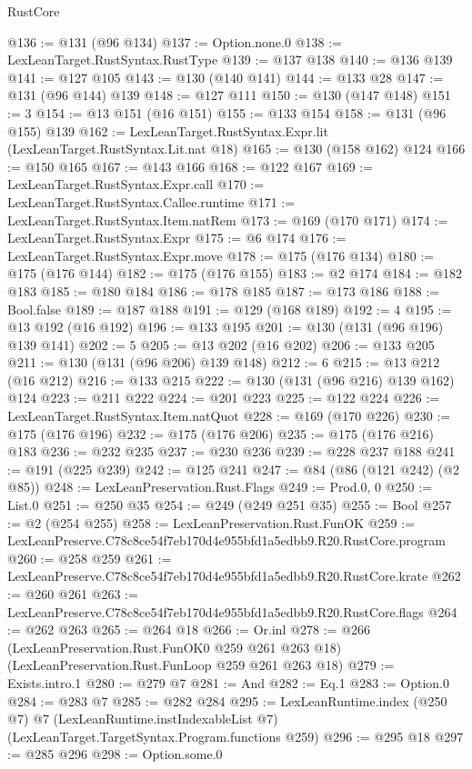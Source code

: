 \begin{lexlean}{RustCore}
\begin{coremodule}
@136 := @131 (@96 @134)
@137 := Option.none.{0}
@138 := LexLeanTarget.RustSyntax.RustType
@139 := @137 @138
@140 := @136 @139
@141 := @127 @105
@143 := @130 (@140 @141)
@144 := @133 @28
@147 := @131 (@96 @144) @139
@148 := @127 @111
@150 := @130 (@147 @148)
@151 := 3
@154 := @13 @151 (@16 @151)
@155 := @133 @154
@158 := @131 (@96 @155) @139
@162 := LexLeanTarget.RustSyntax.Expr.lit (LexLeanTarget.RustSyntax.Lit.nat @18)
@165 := @130 (@158 @162) @124
@166 := @150 @165
@167 := @143 @166
@168 := @122 @167
@169 := LexLeanTarget.RustSyntax.Expr.call
@170 := LexLeanTarget.RustSyntax.Callee.runtime
@171 := LexLeanTarget.RustSyntax.Item.natRem
@173 := @169 (@170 @171)
@174 := LexLeanTarget.RustSyntax.Expr
@175 := @6 @174
@176 := LexLeanTarget.RustSyntax.Expr.move
@178 := @175 (@176 @134)
@180 := @175 (@176 @144)
@182 := @175 (@176 @155)
@183 := @2 @174
@184 := @182 @183
@185 := @180 @184
@186 := @178 @185
@187 := @173 @186
@188 := Bool.false
@189 := @187 @188
@191 := @129 (@168 @189)
@192 := 4
@195 := @13 @192 (@16 @192)
@196 := @133 @195
@201 := @130 (@131 (@96 @196) @139 @141)
@202 := 5
@205 := @13 @202 (@16 @202)
@206 := @133 @205
@211 := @130 (@131 (@96 @206) @139 @148)
@212 := 6
@215 := @13 @212 (@16 @212)
@216 := @133 @215
@222 := @130 (@131 (@96 @216) @139 @162) @124
@223 := @211 @222
@224 := @201 @223
@225 := @122 @224
@226 := LexLeanTarget.RustSyntax.Item.natQuot
@228 := @169 (@170 @226)
@230 := @175 (@176 @196)
@232 := @175 (@176 @206)
@235 := @175 (@176 @216) @183
@236 := @232 @235
@237 := @230 @236
@239 := @228 @237 @188
@241 := @191 (@225 @239)
@242 := @125 @241
@247 := @84 (@86 (@121 @242) (@2 @85))
@248 := LexLeanPreservation.Rust.Flags
@249 := Prod.{0, 0}
@250 := List.{0}
@251 := @250 @35
@254 := @249 (@249 @251 @35)
@255 := Bool
@257 := @2 (@254 @255)
@258 := LexLeanPreservation.Rust.FunOK
@259 := LexLeanPreserve.C78c8ce54f7eb170d4e955bfd1a5edbb9.R20.RustCore.program
@260 := @258 @259
@261 := LexLeanPreserve.C78c8ce54f7eb170d4e955bfd1a5edbb9.R20.RustCore.krate
@262 := @260 @261
@263 := LexLeanPreserve.C78c8ce54f7eb170d4e955bfd1a5edbb9.R20.RustCore.flags
@264 := @262 @263
@265 := @264 @18
@266 := Or.inl
@278 := @266
    (LexLeanPreservation.Rust.FunOK0 @259 @261 @263 @18)
    (LexLeanPreservation.Rust.FunLoop @259 @261 @263 @18)
@279 := Exists.intro.{1}
@280 := @279 @7
@281 := And
@282 := Eq.{1}
@283 := Option.{0}
@284 := @283 @7
@285 := @282 @284
@295 := LexLeanRuntime.index
    (@250 @7)
    @7
    (LexLeanRuntime.instIndexableList @7)
    (LexLeanTarget.TargetSyntax.Program.functions @259)
@296 := @295 @18
@297 := @285 @296
@298 := Option.some.{0}

\end{coremodule}
\end{lexlean}
